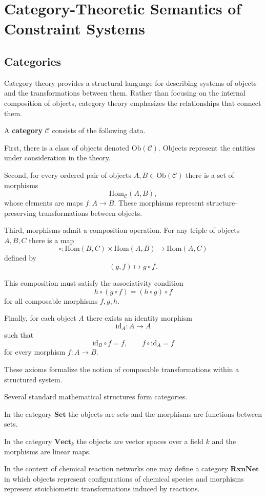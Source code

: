 \documentclass[11pt, openany]{book}
\theoremstyle{plain}
\theoremstyle{definition}
\theoremstyle{remark}
\begin{document}
\chapter{Category-Theoretic Semantics of Constraint Systems}

\section{Categories}

Category theory provides a structural language for describing systems of
objects and the transformations between them.  Rather than focusing on
the internal composition of objects, category theory emphasizes the
relationships that connect them.

A \textbf{category} $\mathcal{C}$ consists of the following data.

First, there is a class of objects denoted $\mathrm{Ob}(\mathcal{C})$.
Objects represent the entities under consideration in the theory.

Second, for every ordered pair of objects $A,B\in\mathrm{Ob}(\mathcal{C})$
there is a set of morphisms
\[
\mathrm{Hom}_{\mathcal{C}}(A,B),
\]
whose elements are maps $f:A\to B$.  These morphisms represent
structure–preserving transformations between objects.

Third, morphisms admit a composition operation.  For any triple of
objects $A,B,C$ there is a map
\[
\circ:
\mathrm{Hom}(B,C)\times\mathrm{Hom}(A,B)
\to
\mathrm{Hom}(A,C)
\]
defined by
\[
(g,f)\mapsto g\circ f .
\]

This composition must satisfy the associativity condition
\[
h\circ(g\circ f)=(h\circ g)\circ f
\]
for all composable morphisms $f,g,h$.

Finally, for each object $A$ there exists an identity morphism
\[
\mathrm{id}_A:A\to A
\]
such that
\[
\mathrm{id}_B\circ f=f,
\qquad
f\circ \mathrm{id}_A=f
\]
for every morphism $f:A\to B$.

These axioms formalize the notion of composable transformations within a
structured system.

\medskip

Several standard mathematical structures form categories.

In the category $\mathbf{Set}$ the objects are sets and the morphisms
are functions between sets.

In the category $\mathbf{Vect}_k$ the objects are vector spaces over a
field $k$ and the morphisms are linear maps.

In the context of chemical reaction networks one may define a category
$\mathbf{RxnNet}$ in which objects represent configurations of chemical
species and morphisms represent stoichiometric transformations induced
by reactions.
\end{document}
